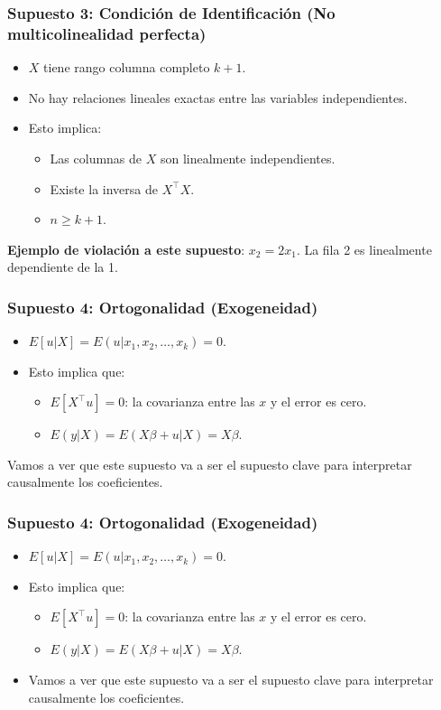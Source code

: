 \documentclass{beamer}
\begin{document}
\begin{frame}
\frametitle{Supuesto 3: Condición de Identificación (No multicolinealidad perfecta)}
\begin{itemize}
    \item $X$ tiene rango columna completo $k + 1$.
    \item No hay relaciones lineales exactas entre las variables independientes.
    \item Esto implica:
    \begin{itemize}
        \item Las columnas de $X$ son linealmente independientes.
        \item Existe la inversa de $X^{\top}X$.
        \item $n \geq k + 1$.
    \end{itemize}
\end{itemize}
\textbf{Ejemplo de violación a este supuesto}: $x_2 = 2x_1$. La fila 2 es linealmente dependiente de la 1.
\end{frame}
\begin{frame}
\frametitle{Supuesto 4: Ortogonalidad (Exogeneidad)}
\begin{itemize}
    \item $E[u|X] = E(u|x_1, x_2, \ldots, x_k) = 0$.
    \item Esto implica que:
    \begin{itemize}
        \item $E[X^{\top}u] = 0$: la covarianza entre las $x$ y el error es cero.
        \item $E(y|X) = E(X\beta + u|X) = X\beta$.
    \end{itemize}
\end{itemize}
Vamos a ver que este supuesto va a ser el supuesto clave para interpretar causalmente los coeficientes.
\end{frame}
\begin{frame}
\frametitle{Supuesto 4: Ortogonalidad (Exogeneidad)}
\begin{itemize}
    \item $E[u|X] = E(u|x_1, x_2, \ldots , x_k) = 0$.
    \item Esto implica que:
    \begin{itemize}
        \item $E[X^{\top}u] = 0$: la covarianza entre las $x$ y el error es cero.
        \item $E(y|X) = E(X\beta + u|X) = X\beta$.
    \end{itemize}
    \item Vamos a ver que este supuesto va a ser el supuesto clave para interpretar causalmente los coeficientes.
\end{itemize}
\end{frame}
\end{document}
